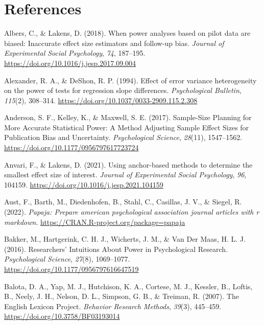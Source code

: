 \documentclass[
  man]{apa7}
\newlength{\cslhangindent}
\newenvironment{CSLReferences}[2] %
 {\begin{list}{}{%
  \setlength{\itemindent}{0pt}
  \setlength{\leftmargin}{0pt}
  \setlength{\parsep}{0pt}
  \ifodd #1
   \setlength{\leftmargin}{\cslhangindent}
   \setlength{\itemindent}{-1\cslhangindent}
  \fi
  \setlength{\itemsep}{#2\baselineskip}}}
 {\end{list}}
\begin{document}
\section{References}\label{references}

\begingroup
\setlength{\parindent}{-0.5in}
\setlength{\leftskip}{0.5in}

\label{refs}
\begin{CSLReferences}{1}{0}
Albers, C., \& Lakens, D. (2018). When power analyses based on pilot data are biased: Inaccurate effect size estimators and follow-up bias. \emph{Journal of Experimental Social Psychology}, \emph{74}, 187--195. \url{https://doi.org/10.1016/j.jesp.2017.09.004}

Alexander, R. A., \& DeShon, R. P. (1994). Effect of error variance heterogeneity on the power of tests for regression slope differences. \emph{Psychological Bulletin}, \emph{115}(2), 308--314. \url{https://doi.org/10.1037/0033-2909.115.2.308}

Anderson, S. F., Kelley, K., \& Maxwell, S. E. (2017). Sample-Size Planning for More Accurate Statistical Power: A Method Adjusting Sample Effect Sizes for Publication Bias and Uncertainty. \emph{Psychological Science}, \emph{28}(11), 1547--1562. \url{https://doi.org/10.1177/0956797617723724}

Anvari, F., \& Lakens, D. (2021). Using anchor-based methods to determine the smallest effect size of interest. \emph{Journal of Experimental Social Psychology}, \emph{96}, 104159. \url{https://doi.org/10.1016/j.jesp.2021.104159}

Aust, F., Barth, M., Diedenhofen, B., Stahl, C., Casillas, J. V., \& Siegel, R. (2022). \emph{Papaja: Prepare american psychological association journal articles with r markdown}. \url{https://CRAN.R-project.org/package=papaja}

Bakker, M., Hartgerink, C. H. J., Wicherts, J. M., \& Van Der Maas, H. L. J. (2016). Researchers{'} Intuitions About Power in Psychological Research. \emph{Psychological Science}, \emph{27}(8), 1069--1077. \url{https://doi.org/10.1177/0956797616647519}

Balota, D. A., Yap, M. J., Hutchison, K. A., Cortese, M. J., Kessler, B., Loftis, B., Neely, J. H., Nelson, D. L., Simpson, G. B., \& Treiman, R. (2007). The English Lexicon Project. \emph{Behavior Research Methods}, \emph{39}(3), 445--459. \url{https://doi.org/10.3758/BF03193014}


\end{CSLReferences}
\end{document}
